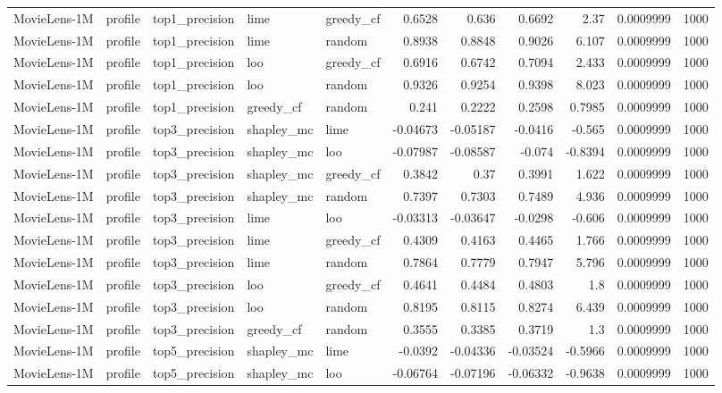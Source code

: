 \begin{table}[t]
\begin{tabular}{lllllrrrrrr}
MovieLens-1M & profile & top1\_precision & lime & greedy\_cf & 0.6528 & 0.636 & 0.6692 & 2.37 & 0.0009999 & 1000 \\
MovieLens-1M & profile & top1\_precision & lime & random & 0.8938 & 0.8848 & 0.9026 & 6.107 & 0.0009999 & 1000 \\
MovieLens-1M & profile & top1\_precision & loo & greedy\_cf & 0.6916 & 0.6742 & 0.7094 & 2.433 & 0.0009999 & 1000 \\
MovieLens-1M & profile & top1\_precision & loo & random & 0.9326 & 0.9254 & 0.9398 & 8.023 & 0.0009999 & 1000 \\
MovieLens-1M & profile & top1\_precision & greedy\_cf & random & 0.241 & 0.2222 & 0.2598 & 0.7985 & 0.0009999 & 1000 \\
MovieLens-1M & profile & top3\_precision & shapley\_mc & lime & -0.04673 & -0.05187 & -0.0416 & -0.565 & 0.0009999 & 1000 \\
MovieLens-1M & profile & top3\_precision & shapley\_mc & loo & -0.07987 & -0.08587 & -0.074 & -0.8394 & 0.0009999 & 1000 \\
MovieLens-1M & profile & top3\_precision & shapley\_mc & greedy\_cf & 0.3842 & 0.37 & 0.3991 & 1.622 & 0.0009999 & 1000 \\
MovieLens-1M & profile & top3\_precision & shapley\_mc & random & 0.7397 & 0.7303 & 0.7489 & 4.936 & 0.0009999 & 1000 \\
MovieLens-1M & profile & top3\_precision & lime & loo & -0.03313 & -0.03647 & -0.0298 & -0.606 & 0.0009999 & 1000 \\
MovieLens-1M & profile & top3\_precision & lime & greedy\_cf & 0.4309 & 0.4163 & 0.4465 & 1.766 & 0.0009999 & 1000 \\
MovieLens-1M & profile & top3\_precision & lime & random & 0.7864 & 0.7779 & 0.7947 & 5.796 & 0.0009999 & 1000 \\
MovieLens-1M & profile & top3\_precision & loo & greedy\_cf & 0.4641 & 0.4484 & 0.4803 & 1.8 & 0.0009999 & 1000 \\
MovieLens-1M & profile & top3\_precision & loo & random & 0.8195 & 0.8115 & 0.8274 & 6.439 & 0.0009999 & 1000 \\
MovieLens-1M & profile & top3\_precision & greedy\_cf & random & 0.3555 & 0.3385 & 0.3719 & 1.3 & 0.0009999 & 1000 \\
MovieLens-1M & profile & top5\_precision & shapley\_mc & lime & -0.0392 & -0.04336 & -0.03524 & -0.5966 & 0.0009999 & 1000 \\
MovieLens-1M & profile & top5\_precision & shapley\_mc & loo & -0.06764 & -0.07196 & -0.06332 & -0.9638 & 0.0009999 & 1000 \\

\end{tabular}
\end{table}
